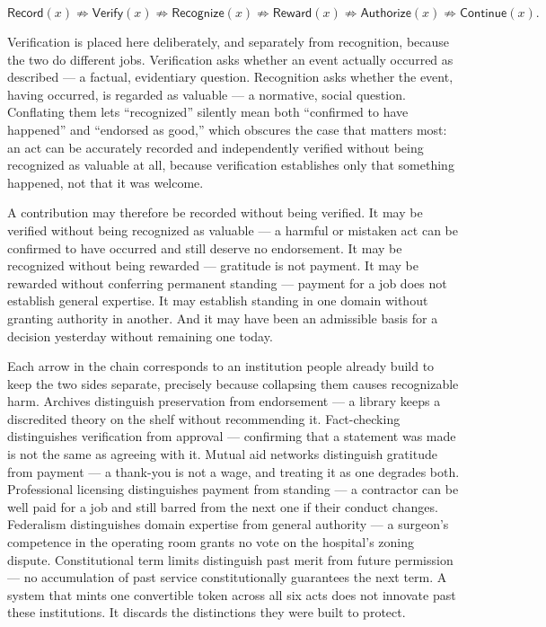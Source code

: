 \documentclass[11pt,oneside]{article}
\theoremstyle{plain}
\theoremstyle{definition}
\newcommand{\Record}{\mathsf{Record}}
\newcommand{\Verify}{\mathsf{Verify}}
\newcommand{\Recognize}{\mathsf{Recognize}}
\newcommand{\Reward}{\mathsf{Reward}}
\newcommand{\Authorize}{\mathsf{Authorize}}
\newcommand{\Continue}{\mathsf{Continue}}
\begin{document}
\begin{equation}
\Record(x) \not\Rightarrow \Verify(x)
\not\Rightarrow \Recognize(x)
\not\Rightarrow \Reward(x)
\not\Rightarrow \Authorize(x)
\not\Rightarrow \Continue(x).
\end{equation}

Verification is placed here deliberately, and separately from recognition, because the two do different jobs. Verification asks whether an event actually occurred as described --- a factual, evidentiary question. Recognition asks whether the event, having occurred, is regarded as valuable --- a normative, social question. Conflating them lets \enquote{recognized} silently mean both \enquote{confirmed to have happened} and \enquote{endorsed as good,} which obscures the case that matters most: an act can be accurately recorded and independently verified without being recognized as valuable at all, because verification establishes only that something happened, not that it was welcome.

A contribution may therefore be recorded without being verified. It may be verified without being recognized as valuable --- a harmful or mistaken act can be confirmed to have occurred and still deserve no endorsement. It may be recognized without being rewarded --- gratitude is not payment. It may be rewarded without conferring permanent standing --- payment for a job does not establish general expertise. It may establish standing in one domain without granting authority in another. And it may have been an admissible basis for a decision yesterday without remaining one today.

Each arrow in the chain corresponds to an institution people already build to keep the two sides separate, precisely because collapsing them causes recognizable harm. Archives distinguish preservation from endorsement --- a library keeps a discredited theory on the shelf without recommending it. Fact-checking distinguishes verification from approval --- confirming that a statement was made is not the same as agreeing with it. Mutual aid networks distinguish gratitude from payment --- a thank-you is not a wage, and treating it as one degrades both. Professional licensing distinguishes payment from standing --- a contractor can be well paid for a job and still barred from the next one if their conduct changes. Federalism distinguishes domain expertise from general authority --- a surgeon's competence in the operating room grants no vote on the hospital's zoning dispute. Constitutional term limits distinguish past merit from future permission --- no accumulation of past service constitutionally guarantees the next term. A system that mints one convertible token across all six acts does not innovate past these institutions. It discards the distinctions they were built to protect.
\end{document}
